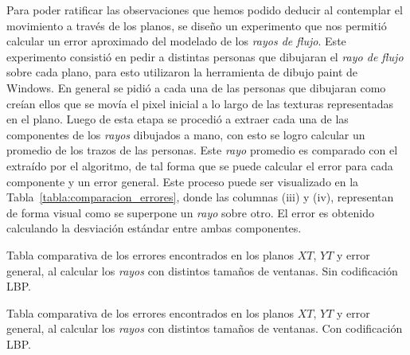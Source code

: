Para poder ratificar las observaciones que hemos podido deducir al contemplar el movimiento a través de los planos, se diseño un experimento que nos permitió calcular un error aproximado del modelado de los \textit{rayos de flujo}. Este experimento consistió en pedir a distintas personas que dibujaran el \textit{rayo de flujo} sobre cada plano, para esto utilizaron la herramienta de dibujo paint de Windows. En general se pidió a cada una de las personas que dibujaran como creían ellos que se movía el pixel inicial a lo largo de las texturas representadas en el plano. Luego de esta etapa se procedió a extraer cada una de las componentes de los \textit{rayos} dibujados a mano, con esto se logro calcular un promedio de los trazos de las personas. Este \textit{rayo} promedio es comparado con el extraído por el algoritmo, de tal forma que se puede calcular el error para cada componente y un error general. Este proceso puede ser visualizado en la Tabla~\ref{tabla:comparacion_errores}, donde las columnas (iii) y (iv), representan de forma visual como se superpone un \textit{rayo} sobre otro. El error es obtenido calculando la desviación estándar entre ambas componentes. 


\begin{table}[tb]
	\centering
	\caption{Tabla comparativa de los errores encontrados en los planos $XT$, $YT$ y error general, al calcular los \textit{rayos} con distintos tamaños de ventanas. Sin codificación LBP.}
	\label{tabla:error_no_lbp}
\end{table}

\begin{table}[tb]
	\centering
	\caption{Tabla comparativa de los errores encontrados en los planos $XT$, $YT$ y error general, al calcular los \textit{rayos} con distintos tamaños de ventanas. Con codificación LBP.}
	\label{tabla:error_lbp}
\end{table}

